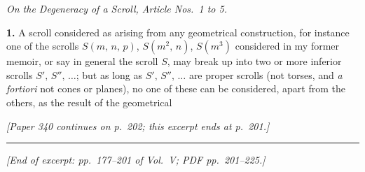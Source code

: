 \documentclass[11pt,a4paper]{article}
\begin{document}
\begin{center}
\textit{On the Degeneracy of a Scroll, Article Nos.\ 1 to 5.}
\end{center}

\textbf{1.} A scroll considered as arising from any geometrical construction, for instance one of the scrolls $S(m,\,n,\,p)$, $S(m^2,\,n)$, $S(m^3)$ considered in my former memoir, or say in general the scroll $S$, may break up into two or more inferior scrolls $S',\,S'',\,\ldots$; but as long as $S',\,S'',\,\ldots$ are proper scrolls (not torses, and \textit{a fortiori} not cones or planes), no one of these can be considered, apart from the others, as the result of the geometrical
\bigskip

\noindent\textit{[Paper 340 continues on p.~202; this excerpt ends at p.~201.]}

\bigskip
\noindent\rule{\textwidth}{0.4pt}
\vspace{1em}

\begin{center}
\textit{[End of excerpt: pp.~177--201 of Vol.~V; PDF pp.~201--225.]}
\end{center}
\end{document}
